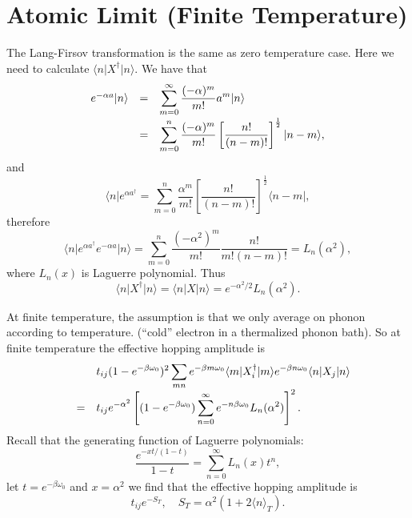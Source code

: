 \documentclass{book}
\newcommand{\bra}[1]{{\langle#1|}}
\newcommand{\ket}[1]{{|#1\rangle}}
\newcommand{\average}[1]{\langle#1\rangle}
\numberwithin{equation}{section}
\begin{document}
\section{Atomic Limit (Finite Temperature)}
The Lang-Firsov transformation is the same as zero temperature
case. Here we need to calculate $\bra{n}X^\dag\ket{n}$. We have that
\begin{equation}
  \begin{array}{rcl}
  e^{-\alpha a}\ket{n}&=&\displaystyle\sum_{m=0}^\infty
  \frac{(-\alpha)^m}{m!}a^m\ket{n}\\\vbox to 20pt{}
  &=&\displaystyle\sum_{m=0}^n\frac{(-\alpha)^m}{m!}\left[
  \frac{n!}{(n-m)!}\right]^{\frac{1}{2}}\ket{n-m},
  \end{array}
\end{equation}
and
\begin{equation}
  \bra{n}e^{\alpha a^\dag}=\sum_{m=0}^n\frac{\alpha^m}{m!}\left[
  \frac{n!}{(n-m)!}\right]^{\frac{1}{2}}\bra{n-m},
\end{equation}
therefore
\begin{equation}
  \bra{n}e^{\alpha a^\dag}e^{-\alpha a}\ket{n}=
  \sum_{m=0}^n\frac{(-\alpha^2)^m}{m!}\frac{n!}{m!(n-m)!}=L_n(\alpha^2),
\end{equation}
where $L_n(x)$ is Laguerre polynomial. Thus
\begin{equation}
  \bra{n}X^\dag\ket{n}=\bra{n}X\ket{n}=e^{-\alpha^2/2}L_n(\alpha^2).
\end{equation}

At finite temperature, the assumption is that we only average on
phonon according to temperature. (``cold'' electron in a thermalized
phonon bath). So at finite temperature the effective hopping amplitude is
\begin{equation}
  \begin{array}{rcl}
    &&\displaystyle t_{ij}(1-e^{-\beta\omega_0})^2\sum_{mn}e^{-\beta m\omega_0}
    \bra{m}X_i^\dag\ket{m}e^{-\beta n\omega_0}\bra{n}X_j\ket{n}
    \\\vbox to 20pt{}
    &=&\displaystyle t_{ij}e^{-\alpha^2}\left[(1-e^{-\beta\omega_0})
      \sum_{n=0}^\infty e^{-n\beta\omega_0}L_n(\alpha^2)\right]^2.\\
  \end{array}
\end{equation}
Recall that the generating function of Laguerre polynomials:
\begin{equation}
  \frac{e^{-xt/(1-t)}}{1-t}=\sum_{n=0}^\infty L_n(x)t^n,
\end{equation}
let $t=e^{-\beta\omega_0}$ and $x=\alpha^2$ we find that the effective
hopping amplitude is
\begin{equation}
t_{ij}e^{-S_T}, \quad  S_T=\alpha^2(1+2\average{n}_T).
\end{equation}
\end{document}
